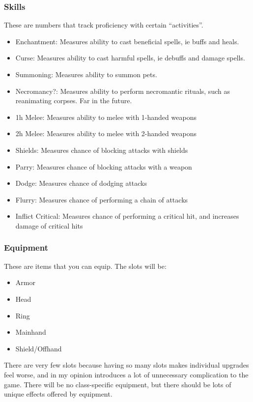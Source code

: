 \documentclass{article}
\begin{document}
\subsubsection{Skills}
These are numbers that track proficiency with certain ``activities''.
\begin{itemize}
    \item Enchantment: Measures ability to cast beneficial spells, ie buffs and heals.
    \item Curse: Measures ability to cast harmful spells, ie debuffs and damage spells.
    \item Summoning: Measures ability to summon pets.
    \item Necromancy?: Measures ability to perform necromantic rituals, such as reanimating corpses.
        Far in the future.
    \item 1h Melee: Measures ability to melee with 1-handed weapons
    \item 2h Melee: Measures ability to melee with 2-handed weapons
    \item Shields: Measures chance of blocking attacks with shields
    \item Parry: Measures chance of blocking attacks with a weapon
    \item Dodge: Measures chance of dodging attacks
    \item Flurry: Measures chance of performing a chain of attacks
    \item Inflict Critical: Measures chance of performing a critical hit, and increases damage of critical hits
\end{itemize}

\subsubsection{Equipment}
These are items that you can equip. The slots will be:
\begin{itemize}
    \item Armor
    \item Head
    \item Ring
    \item Mainhand
    \item Shield/Offhand
\end{itemize}
There are very few slots because having so many slots makes individual upgrades feel worse, and in
my opinion introduces a lot of unnecessary complication to the game. There will be no class-specific
equipment, but there should be lots of unique effects offered by equipment.
\end{document}
